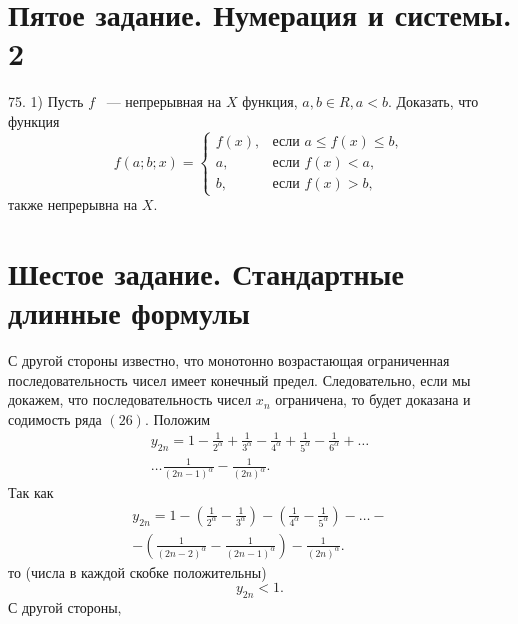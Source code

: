 \documentclass[a4paper,12pt]{article} %
\begin{document}
	\section{Пятое задание. Нумерация и системы. 2}
	75. 1) Пусть $f$ ~--- непрерывная на $X$ функция, $a, b \in R, a < b.$ Доказать, что функция
	\[
		f(a;b;x)=\begin{cases}
			f \left(x \right), &\text{если } a \leqslant f \left(x \right) \leqslant b, \\
		a, &\text{если } f \left(x \right) < a, \\
		b, &\text{если } f \left(x \right) > b,
		\end{cases}
	\]
	также непрерывна на $X.$
	\section{Шестое задание. Стандартные длинные формулы}
	С другой стороны известно, что монотонно возрастающая ограниченная последовательность чисел имеет конечный предел. Следовательно, если мы докажем, что последовательность чисел $x_n$ ограничена, то будет доказана и содимость ряда $\left( 26 \right)$. Положим
	\begin{multline*}
		y_{2n} = 1 - 
		\frac{1}{2^ \alpha} + 
		\frac{1}{3^ \alpha} -
		\frac{1}{4^ \alpha} +
		\frac{1}{5^ \alpha} -
		\frac{1}{6^ \alpha} + 
		\dots \\
		\dots 
		\frac{1}{ \left(2n - 1 \right)^ \alpha} -
		\frac{1}{ \left(2n \right)^ \alpha}.
	\end{multline*}
	Так как
	\begin{multline*}
		y_{2n} = 1 - 
		\left( 
			\frac{1}{2^ \alpha} - 
			\frac{1}{3^ \alpha}
		\right) -
		\left(
			\frac{1}{4^ \alpha} -
			\frac{1}{5^ \alpha} 
		\right) - 
		\dots - \\
		- \left(
			\frac{1}{ \left(2n - 2 \right)^ \alpha} -
			\frac{1}{ \left(2n - 1 \right)^ \alpha} 
		\right) -
		\frac{1}{ \left(2n \right)^ \alpha}.
	\end{multline*}
	то (числа в каждой скобке положительны)
	$$y_{2n} < 1.$$
	С другой стороны,
\end{document}
